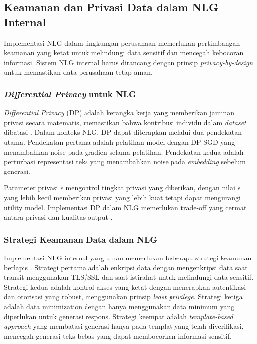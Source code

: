 \subsection{Keamanan dan Privasi Data dalam NLG Internal}

Implementasi NLG dalam lingkungan perusahaan memerlukan pertimbangan keamanan yang ketat untuk melindungi data sensitif dan mencegah kebocoran informasi. Sistem NLG internal harus dirancang dengan prinsip \textit{privacy-by-design} untuk memastikan data perusahaan tetap aman.

\subsubsection{\textit{Differential Privacy} untuk NLG}

\textit{Differential Privacy} (DP) adalah kerangka kerja yang memberikan jaminan privasi secara matematis, memastikan bahwa kontribusi individu dalam \textit{dataset} dibatasi \autocite{feyisetan2022differential,mireshghallah2022differentially}. Dalam konteks NLG, DP dapat diterapkan melalui dua pendekatan utama. Pendekatan pertama adalah pelatihan model dengan DP-SGD yang menambahkan noise pada gradien selama pelatihan. Pendekatan kedua adalah perturbasi representasi teks yang menambahkan noise pada \textit{embedding} sebelum generasi.

Parameter privasi $\epsilon$\label{sym:epsilon} mengontrol tingkat privasi yang diberikan, dengan nilai $\epsilon$ yang lebih kecil memberikan privasi yang lebih kuat tetapi dapat mengurangi utility model. Implementasi DP dalam NLG memerlukan trade-off yang cermat antara privasi dan kualitas output \autocite{luo2024data}.

\subsubsection{Strategi Keamanan Data dalam NLG}

Implementasi NLG internal yang aman memerlukan beberapa strategi keamanan berlapis \autocite{itconvergence2024generative}. Strategi pertama adalah enkripsi data dengan mengenkripsi data saat transit menggunakan TLS/SSL dan saat istirahat untuk melindungi data sensitif. Strategi kedua adalah kontrol akses yang ketat dengan menerapkan autentikasi dan otorisasi yang robust, menggunakan prinsip \textit{least privilege}. Strategi ketiga adalah data minimization dengan hanya menggunakan data minimum yang diperlukan untuk generasi respons. Strategi keempat adalah \textit{template-based approach} yang membatasi generasi hanya pada templat yang telah diverifikasi, mencegah generasi teks bebas yang dapat membocorkan informasi sensitif.

